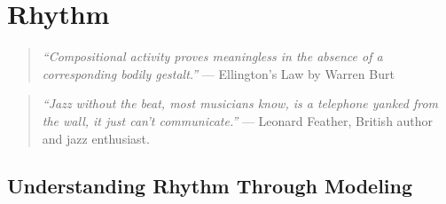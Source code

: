 \chapter{Rhythm}
\vspace{10mm}


\begin{quote}
  {\it   
  ``Compositional activity proves meaningless in the
  absence of a corresponding bodily gestalt.''} --- Ellington's Law 
by Warren Burt 
\end{quote}

\begin{quote}
  {\it ``Jazz without the beat, most musicians know, is a telephone yanked
  from the wall, it just can't communicate.''} --- Leonard Feather,
British author and jazz enthusiast.
\end{quote}

\vspace{7mm}
\section{Understanding Rhythm Through Modeling}
\vspace{5mm}

